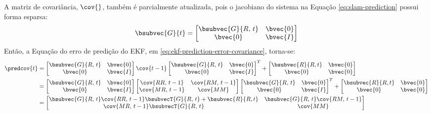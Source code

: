 A matriz de covariância, $\cov{}$, também é parcialmente atualizada, pois o jacobiano do sistema na Equação \ref{eq:slam-prediction} possui forma esparsa:
\newcommand{\slamsystemjacobian}{
  \bsubvec{G}{t} = \begin{bmatrix}
    \bsubvec{G}{R, \,t} & \bvec{0} \\
    \bvec{0} & \bvec{I}
  \end{bmatrix}
}
\begin{equation}
  \slamsystemjacobian
  \label{eq:slam-system-jacobian}
\end{equation}
Então, a Equação do erro de predição do EKF, em \ref{eq:ekf-prediction-error-covariance}, torna-se:
\renewcommand{\arraystretch}{1.5}
\begin{equation}
\begin{aligned}
  \predcov{t} &= \begin{bmatrix}
    \bsubvec{G}{R, \,t} & \bvec{0} \\
    \bvec{0} & \bvec{I}
  \end{bmatrix} \cov{t-1}  \begin{bmatrix}
    \bsubvec{G}{R, \,t} & \bvec{0} \\
    \bvec{0} & \bvec{I}  
  \end{bmatrix}^T + \begin{bmatrix}
      \bsubvec{R}{R, t}  & \bvec{0} \\ \bvec{0} & \bvec{0}
    \end{bmatrix} \\
  &= \begin{bmatrix}
    \bsubvec{G}{R, \,t} & \bvec{0} \\
    \bvec{0} & \bvec{I}
  \end{bmatrix} 
  \begin{bmatrix}
    \cov{RR, \, t-1} & \cov{RM, \, t-1} \\
    \cov{MR, \,t-1} & \cov{MM}
  \end{bmatrix}  
  \begin{bmatrix}
    \bsubvec{G}{R, \,t} & \bvec{0} \\
    \bvec{0} & \bvec{I}  
  \end{bmatrix}^T + \begin{bmatrix}
      \bsubvec{R}{R, t} & \bvec{0} \\ \bvec{0} & \bvec{0}
    \end{bmatrix} \\
  &= \begin{bmatrix}
    \bsubvec{G}{R,\,t} \cov{RR,\, t-1} \bsubvecT{G}{R, \,t} + \bsubvec{R}{R, t}&  \bsubvec{G}{R,\, t} \cov{RM,\, t-1}\\
    \cov{MR,\, t-1}\bsubvecT{G}{R,\, t} & \cov{MM} 
  \end{bmatrix} 
\end{aligned}
\label{eq:ekf-slam-prediction-error-covariance}
\end{equation}
